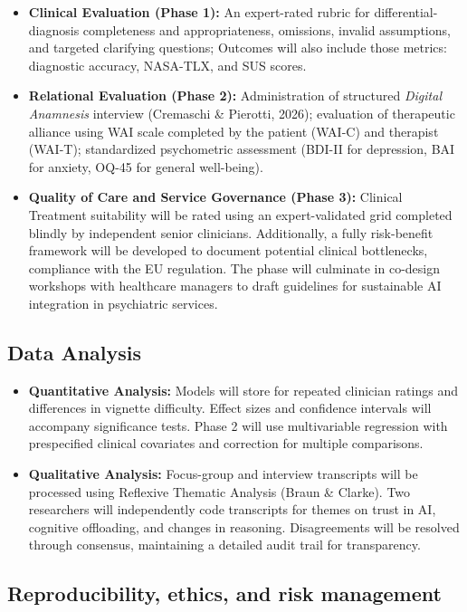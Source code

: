 \documentclass[11pt,a4paper]{article}
\begin{document}
\begin{itemize}
    \item \textbf{Clinical Evaluation (Phase 1):} An expert-rated rubric for differential-diagnosis completeness and appropriateness, omissions, invalid assumptions, and targeted clarifying questions; Outcomes will also include those metrics: diagnostic accuracy, NASA-TLX, and SUS scores.
    \item \textbf{Relational Evaluation (Phase 2):} Administration of structured \textit{Digital Anamnesis} interview (Cremaschi \& Pierotti, 2026); evaluation of therapeutic alliance using WAI scale completed by the patient (WAI-C) and therapist (WAI-T); standardized psychometric assessment (BDI-II for depression, BAI for anxiety, OQ-45 for general well-being).
    \item \textbf{Quality of Care and Service Governance (Phase 3):} Clinical Treatment suitability will be rated using an expert-validated grid completed blindly by independent senior clinicians. Additionally, a fully risk-benefit framework will be developed to document potential clinical bottlenecks, compliance with the EU regulation. The phase will culminate in co-design workshops with healthcare managers to draft guidelines for sustainable AI integration in psychiatric services.
\end{itemize}

\subsection{Data Analysis}

\begin{itemize}
    \item \textbf{Quantitative Analysis:} Models will store for repeated clinician ratings and differences in vignette difficulty. Effect sizes and confidence intervals will accompany significance tests. Phase 2 will use multivariable regression with prespecified clinical covariates and correction for multiple comparisons.
    \item \textbf{Qualitative Analysis:} Focus-group and interview transcripts will be processed using Reflexive Thematic Analysis (Braun \& Clarke). Two researchers will independently code transcripts for themes on trust in AI, cognitive offloading, and changes in reasoning. Disagreements will be resolved through consensus, maintaining a detailed audit trail for transparency.
\end{itemize}

\subsection{Reproducibility, ethics, and risk management}
\end{document}
